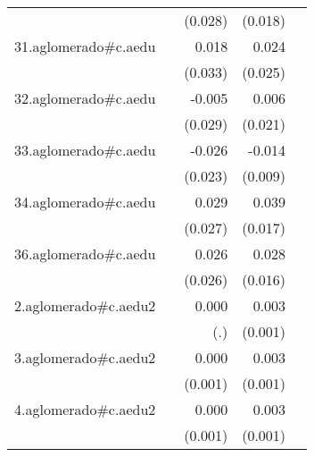 {\begin{longtable}{l*{4}{D{.}{.}{-1}}}
            &                     &     (0.028)         &     (0.018)         &                     \\
\addlinespace
31.aglomerado#c.aedu&                     &       0.018         &       0.024         &                     \\
            &                     &     (0.033)         &     (0.025)         &                     \\
\addlinespace
32.aglomerado#c.aedu&                     &      -0.005         &       0.006         &                     \\
            &                     &     (0.029)         &     (0.021)         &                     \\
\addlinespace
33.aglomerado#c.aedu&                     &      -0.026         &      -0.014         &                     \\
            &                     &     (0.023)         &     (0.009)         &                     \\
\addlinespace
34.aglomerado#c.aedu&                     &       0.029         &       0.039\sym{*}  &                     \\
            &                     &     (0.027)         &     (0.017)         &                     \\
\addlinespace
36.aglomerado#c.aedu&                     &       0.026         &       0.028         &                     \\
            &                     &     (0.026)         &     (0.016)         &                     \\
\addlinespace
2.aglomerado#c.aedu2&                     &       0.000         &       0.003\sym{***}&                     \\
            &                     &         (.)         &     (0.001)         &                     \\
\addlinespace
3.aglomerado#c.aedu2&                     &       0.000         &       0.003\sym{***}&                     \\
            &                     &     (0.001)         &     (0.001)         &                     \\
\addlinespace
4.aglomerado#c.aedu2&                     &       0.000         &       0.003\sym{***}&                     \\
            &                     &     (0.001)         &     (0.001)         &                     \\

\end{longtable}}
